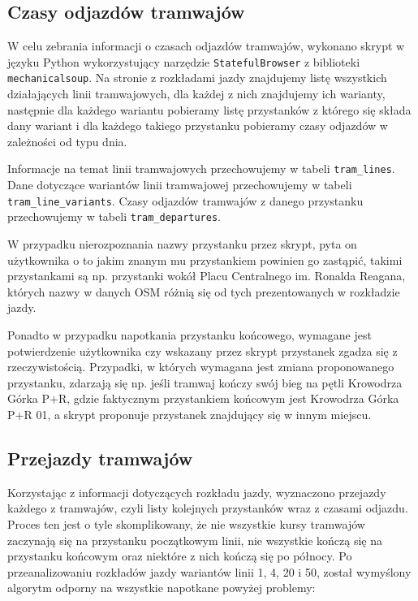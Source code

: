 \documentclass[12pt,a4paper]{article}
\begin{document}
        \subsection{Czasy odjazdów tramwajów}
            W celu zebrania informacji o czasach odjazdów tramwajów, wykonano skrypt w języku Python wykorzystujący narzędzie \texttt{StatefulBrowser} z biblioteki \texttt{mechanicalsoup}\cite{mechanicalsoup}. Na stronie z rozkładami jazdy znajdujemy listę wszystkich działających linii tramwajowych, dla każdej z nich znajdujemy ich warianty, następnie dla każdego wariantu pobieramy listę przystanków z którego się składa dany wariant i dla każdego takiego przystanku pobieramy czasy odjazdów w zależności od typu dnia.

            Informacje na temat linii tramwajowych przechowujemy w tabeli \texttt{tram\_lines}. Dane dotyczące wariantów linii tramwajowej przechowujemy w tabeli \texttt{tram\_line\_variants}. Czasy odjazdów tramwajów z danego przystanku przechowujemy w tabeli \texttt{tram\_departures}.

            W przypadku nierozpoznania nazwy przystanku przez skrypt, pyta on użytkownika o to jakim znanym mu przystankiem powinien go zastąpić, takimi przystankami są np. przystanki wokół Placu Centralnego im. Ronalda Reagana, których nazwy w danych OSM różnią się od tych prezentowanych w rozkładzie jazdy.

            Ponadto w przypadku napotkania przystanku końcowego, wymagane jest potwierdzenie użytkownika czy wskazany przez skrypt przystanek zgadza się z rzeczywistością. Przypadki, w których wymagana jest zmiana proponowanego przystanku, zdarzają się np. jeśli tramwaj kończy swój bieg na pętli Krowodrza Górka P+R, gdzie faktycznym przystankiem końcowym jest Krowodrza Górka P+R 01, a skrypt proponuje przystanek znajdujący się w innym miejscu.

        \subsection{Przejazdy tramwajów}
            Korzystając z informacji dotyczących rozkładu jazdy, wyznaczono przejazdy każdego z tramwajów, czyli listy kolejnych przystanków wraz z czasami odjazdu. Proces ten jest o tyle skomplikowany, że nie wszystkie kursy tramwajów zaczynają się na przystanku początkowym linii, nie wszystkie kończą się na przystanku końcowym oraz niektóre z nich kończą się po północy. Po przeanalizowaniu rozkładów jazdy wariantów linii 1, 4, 20 i 50, został wymyślony algorytm odporny na wszystkie napotkane powyżej problemy:
\end{document}
